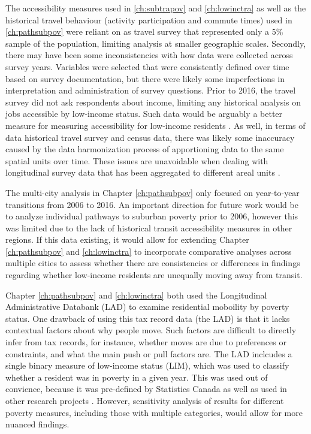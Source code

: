 The accessibility measures used in \ref{ch:subtrapov} and \ref{ch:lowinctra} as well as the historical travel behaviour (activity participation and commute times) used in \ref{ch:pathsubpov} were reliant on as travel survey that represented only a 5\% sample of the population, limiting analysis at smaller geographic scales. Secondly, there may have been some inconsistencies with how data were collected across survey years. Variables were selected that were consistently defined over time based on survey documentation, but there were likely some imperfections in interpretation and administration of survey questions. Prior to 2016, the travel survey did not ask respondents about income, limiting any historical analysis on jobs accessible by low-income status. Such data would be arguably a better measure for measuring accessibility for low-income residents \cite{fan_impact_2012,cui_accessibility_2019,allen_sizing_2019}. As well, in terms of data historical travel survey and census data, there was likely some inaccuracy caused by the data harmonization process of apportioning data to the same spatial units over time. These issues are unavoidable when dealing with longitudinal survey data that has been aggregated to different areal units \cite{allen_new_2018}. 

The multi-city analysis in Chapter \ref{ch:pathsubpov} only focused on year-to-year transitions from 2006 to 2016. An important direction for future work would be to analyze individual pathways to suburban poverty prior to 2006, however this was limited due to the lack of historical transit accessibility measures in other regions. If this data existing, it would allow for extending Chapter \ref{ch:pathsubpov} and \ref{ch:lowinctra} to incorporate comparative analyses across multiple cities to assess whether there are consistencies or differences in findings regarding whether low-income residents are unequally moving away from transit.

Chapter \ref{ch:pathsubpov} and \ref{ch:lowinctra} both used the Longitudinal Administrative Databank (LAD) to examine residential moboility by poverty status. One drawback of using this tax record data (the LAD) is that it lacks contextual factors about why people move. Such factors are difficult to directly infer from tax records, for instance, whether moves are due to preferences or constraints, and what the main push or pull factors are. The LAD inclcudes a single binary measure of low-income status (LIM), which was used to classify whether a resident was in poverty in a given year. This was used out of convience, because it was pre-defined by Statistics Canada as well as used in other research projects \cite{picot_immigration_2014,allen_sizing_2019,brown_money_2019}. However, sensitivity analysis of results for different poverty measures, including those with multiple categories, would allow for more nuanced findings. 

